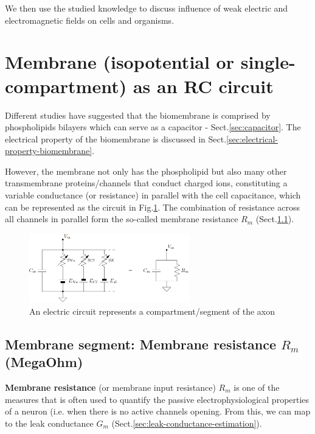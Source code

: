 We then use the studied knowledge to discuss influence of weak
electric and electromagnetic fields on cells and organisms.




\section{Membrane (isopotential or single-compartment) as an RC circuit}
\label{sec:membrane-RC-circuit}
\label{sec:plasmamembrane-as-RC}

Different studies have suggested that the biomembrane is comprised by
phospholipids bilayers which can serve as a capacitor -
Sect.\ref{sec:capacitor}. The electrical property of the biomembrane is
discussed in Sect.\ref{sec:electrical-property-biomembrane}.

However, the membrane not only has the phospholipid but also many other
transmembrane proteins/channels that conduct charged ions, constituting
a variable conductance (or resistance) in parallel with the cell capacitance,
which can be represented as the circuit in Fig.\ref{fig:membrane_RC}.
The combination of resistance across all channels in parallel form the
so-called membrane resistance $R_m$ (Sect.\ref{sec:membrane-resistance}).

\begin{figure}[hbt]
  \centerline{\includegraphics[height=3cm,
    angle=0]{./images/membrane_RC.eps}}
  \caption{An electric circuit represents a compartment/segment of the axon}
  \label{fig:membrane_RC}
\end{figure}


\subsection{Membrane segment: Membrane resistance $R_m$ (MegaOhm)}
\label{sec:membrane-resistance}
\label{sec:input-resistance}
\label{sec:injected-current}

{\bf Membrane resistance} (or membrane input resistance) $R_m$ is one of the
measures that is often used to quantify the passive electrophysiological
properties of a neuron (i.e. when there is no active channels opening. From
this, we can map to the leak conductance $G_m$
(Sect.\ref{sec:leak-conductance-estimation}).

